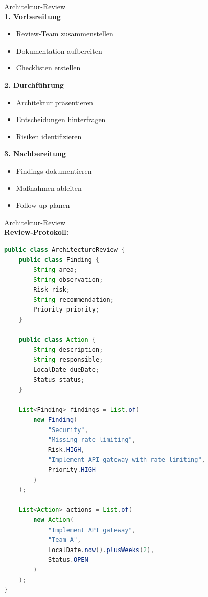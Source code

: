 \begin{KR}{Architektur-Review}\\
\textbf{1. Vorbereitung}
\begin{itemize}
    \item Review-Team zusammenstellen
    \item Dokumentation aufbereiten
    \item Checklisten erstellen
\end{itemize}

\textbf{2. Durchführung}
\begin{itemize}
    \item Architektur präsentieren
    \item Entscheidungen hinterfragen
    \item Risiken identifizieren
\end{itemize}

\textbf{3. Nachbereitung}
\begin{itemize}
    \item Findings dokumentieren
    \item Maßnahmen ableiten
    \item Follow-up planen
\end{itemize}
\end{KR}

\begin{example2}{Architektur-Review}\\
\textbf{Review-Protokoll:}

\begin{lstlisting}[language=Java, style=basesmol]
public class ArchitectureReview {
    public class Finding {
        String area;
        String observation;
        Risk risk;
        String recommendation;
        Priority priority;
    }
    
    public class Action {
        String description;
        String responsible;
        LocalDate dueDate;
        Status status;
    }
    
    List<Finding> findings = List.of(
        new Finding(
            "Security",
            "Missing rate limiting",
            Risk.HIGH,
            "Implement API gateway with rate limiting",
            Priority.HIGH
        )
    );
    
    List<Action> actions = List.of(
        new Action(
            "Implement API gateway",
            "Team A",
            LocalDate.now().plusWeeks(2),
            Status.OPEN
        )
    );
}
\end{lstlisting}
\end{example2}

